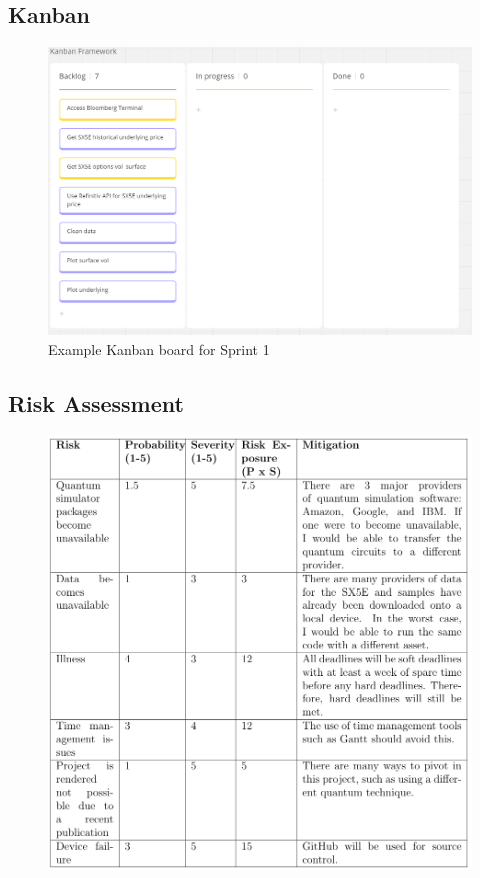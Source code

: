 \documentclass[12pt]{article}
\numberwithin{equation}{section}
\begin{document}
\subsection{Kanban}
\begin{figure}[h]
    \centering
    \includegraphics[scale=0.75]{Kanban.png}
    \caption{Example Kanban board for Sprint 1}
\end{figure}
\clearpage
\subsection{Risk Assessment}
\begin{figure}[h]
    \centering
    \includegraphics[scale=1]{RiskAssess.png}
\end{figure}
\end{document}
